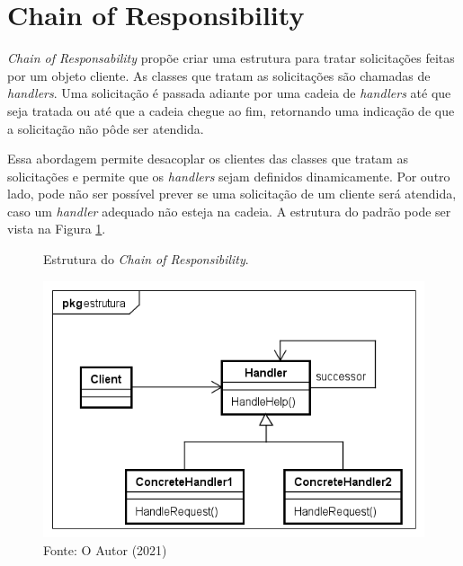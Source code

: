 
\section{Chain of Responsibility}

\textit{Chain of Responsability} propõe criar uma estrutura para 
tratar solicitações feitas por um objeto cliente. As classes 
que tratam as solicitações são chamadas de \textit{handlers}. 
Uma solicitação é passada adiante por uma cadeia de 
\textit{handlers} até que seja tratada ou 
até que a cadeia chegue ao fim, retornando uma 
indicação de que a solicitação não pôde ser atendida.\cite{gamma:1995}

Essa abordagem permite desacoplar os clientes das classes 
que tratam as solicitações e permite que os \textit{handlers} 
sejam definidos dinamicamente. Por outro lado, pode não ser 
possível prever se uma solicitação de um cliente será atendida, 
caso um \textit{handler} adequado não esteja na cadeia. A 
estrutura do padrão pode ser vista na Figura \ref{chain_struct}.

\begin{figure}[htb]
	\caption{\label{chain_struct}Estrutura do \textit{Chain of Responsibility}.}
	\begin{center}
	    \includegraphics[scale=0.5]{5_padroes-contexto-funcional/5.3_comportamentais/5.3.01_chain-of-responsibility/chainofresponsibility_struct.png}
	\end{center}
  \caption*{Fonte: O Autor (2021)}
\end{figure}

